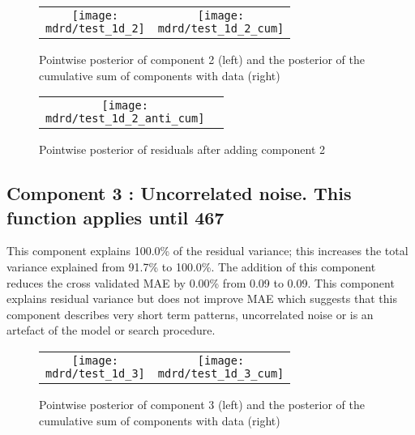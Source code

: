 \documentclass{article} %
\begin{document}
\begin{figure}[H]
\newcommand{\wmgd}{0.5\columnwidth}
\newcommand{\hmgd}{3.0cm}
\newcommand{\mdrd}{test_1d}
\newcommand{\mbm}{\hspace{-0.3cm}}
\begin{tabular}{cc}
\mbm \texttt{[image: \\mdrd/test\_1d\_2]} & \texttt{[image: \\mdrd/test\_1d\_2\_cum]}
\end{tabular}
\caption{Pointwise posterior of component 2 (left) and the posterior of the cumulative sum of components with data (right)}
\label{fig:comp2}
\end{figure}

\begin{figure}[H]
\newcommand{\wmgd}{0.5\columnwidth}
\newcommand{\hmgd}{3.0cm}
\newcommand{\mdrd}{test_1d}
\newcommand{\mbm}{\hspace{-0.3cm}}
\begin{tabular}{cc}
\mbm \texttt{[image: \\mdrd/test\_1d\_2\_anti\_cum]}
\end{tabular}
\caption{Pointwise posterior of residuals after adding component 2}
\label{fig:comp2}
\end{figure}

\subsection{Component 3 : Uncorrelated noise. This function applies until  467}



This component explains 100.0\% of the residual variance; this increases the total variance explained from 91.7\% to 100.0\%.
The addition of this component reduces the cross validated MAE by 0.00\% from 0.09 to 0.09.
This component explains residual variance but does not improve MAE which suggests that this component describes very short term patterns, uncorrelated noise or is an artefact of the model or search procedure.

\begin{figure}[H]
\newcommand{\wmgd}{0.5\columnwidth}
\newcommand{\hmgd}{3.0cm}
\newcommand{\mdrd}{test_1d}
\newcommand{\mbm}{\hspace{-0.3cm}}
\begin{tabular}{cc}
\mbm \texttt{[image: \\mdrd/test\_1d\_3]} & \texttt{[image: \\mdrd/test\_1d\_3\_cum]}
\end{tabular}
\caption{Pointwise posterior of component 3 (left) and the posterior of the cumulative sum of components with data (right)}
\label{fig:comp3}
\end{figure}
\end{document}
